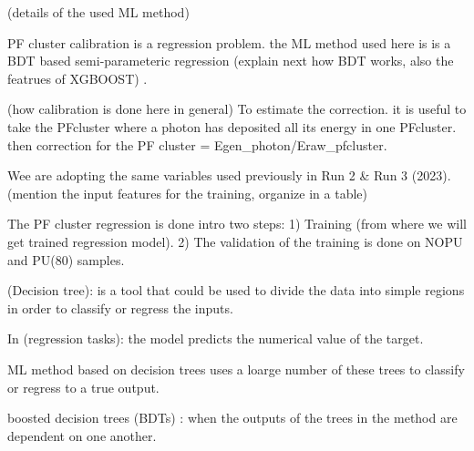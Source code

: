 (details of the used ML method)


PF cluster calibration is a regression problem. the ML method used here is is a BDT based semi-parameteric regression
(explain next how BDT works, also the featrues of  XGBOOST) .

(how calibration is done here in general)
To estimate the correction. it is useful to take the PFcluster where a photon has deposited all its energy in one PFcluster.
then correction for the PF cluster = Egen_photon/Eraw_pfcluster.




Wee are adopting the same variables used previously in Run 2 & Run 3 (2023).
(mention the input features for the training, organize in a table) 

The PF cluster regression is done intro two steps:
1) Training (from where we will get trained regression model).
2) The validation of the training is done on NOPU and PU(80) samples.



(Decision tree): is a tool that could be used to divide the data into simple regions in order to classify or regress the inputs.

In (regression tasks): the model predicts the numerical value of the target.

ML method based on decision trees uses a loarge number of these trees to classify or regress to a true output.

boosted decision trees (BDTs) : when the outputs of the trees in the method are dependent on one another.

